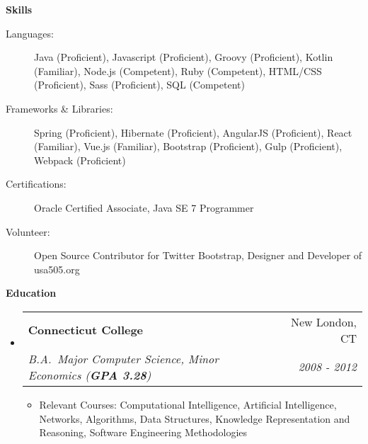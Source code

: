 \documentclass[letterpaper,11pt]{article}
\makeatletter
\newcommand{\resitem}[1]{\item #1 \vspace{-2pt}}
\newcommand{\resheading}[1]{{\large \colorbox{mygrey}{\begin{minipage}{\textwidth}{\textbf{#1 \vphantom{p\^{E}}}}\end{minipage}}}}
\newcommand{\ressubheading}[4]{
    \begin{tabular*}{7.0in}{l@{\extracolsep{\fill}}r}
        \textbf{#1} & #2 \\
        \textit{#3} & \textit{#4} \\
    \end{tabular*}\vspace{-6pt}}
\makeatother
\begin{document}
    \resheading{Skills}
    \begin{description}
        \item[Languages:]
        Java (Proficient), Javascript (Proficient), Groovy (Proficient), Kotlin (Familiar), Node.js (Competent), Ruby (Competent), HTML/CSS (Proficient), Sass (Proficient), SQL (Competent)
        \item[Frameworks \& Libraries:]
        Spring (Proficient), Hibernate (Proficient), AngularJS (Proficient), React (Familiar), Vue.js (Familiar), Bootstrap (Proficient), Gulp (Proficient), Webpack (Proficient)
        \item[Certifications:]
        Oracle Certified Associate, Java SE 7 Programmer
        \item[Volunteer:]
        Open Source Contributor for Twitter Bootstrap, Designer and Developer of usa505.org
    \end{description}

    \resheading{Education}
    \begin{itemize}
        \item
        \ressubheading{Connecticut College}{New London, CT}{B.A.\ Major Computer Science, Minor Economics (\textbf{GPA 3.28})}{2008 - 2012}
        \begin{itemize}
            \resitem{Relevant Courses: Computational Intelligence, Artificial Intelligence, Networks, Algorithms, Data Structures, Knowledge Representation and Reasoning, Software Engineering Methodologies}
        \end{itemize}
    \end{itemize}
\end{document}
